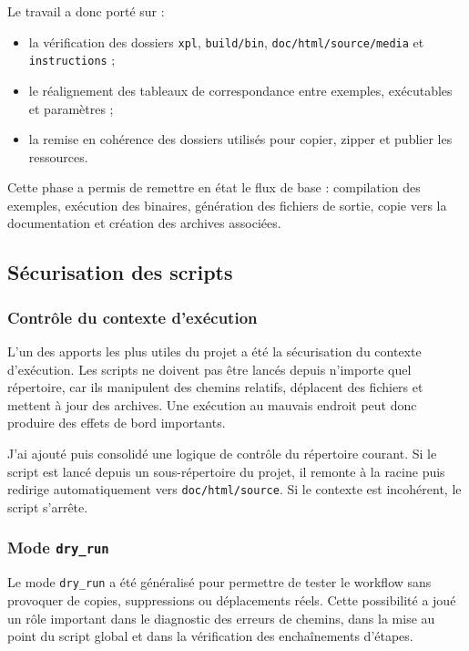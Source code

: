 \documentclass[a4paper,12pt,twoside]{article}
\begin{document}
Le travail a donc porté sur :
\begin{itemize}
    \item la vérification des dossiers \texttt{xpl}, \texttt{build/bin}, \texttt{doc/html/source/media} et \texttt{instructions} ;
    \item le réalignement des tableaux de correspondance entre exemples, exécutables et paramètres ;
    \item la remise en cohérence des dossiers utilisés pour copier, zipper et publier les ressources.
\end{itemize}

Cette phase a permis de remettre en état le flux de base : compilation des exemples, exécution des binaires, génération des fichiers de sortie, copie vers la documentation et création des archives associées.

\subsection{Sécurisation des scripts}

\subsubsection{Contrôle du contexte d'exécution}

L'un des apports les plus utiles du projet a été la sécurisation du contexte d'exécution. Les scripts ne doivent pas être lancés depuis n'importe quel répertoire, car ils manipulent des chemins relatifs, déplacent des fichiers et mettent à jour des archives. Une exécution au mauvais endroit peut donc produire des effets de bord importants.

J'ai ajouté puis consolidé une logique de contrôle du répertoire courant. Si le script est lancé depuis un sous-répertoire du projet, il remonte à la racine puis redirige automatiquement vers \texttt{doc/html/source}. Si le contexte est incohérent, le script s'arrête.

\subsubsection{Mode \texttt{dry\_run}}

Le mode \texttt{dry\_run} a été généralisé pour permettre de tester le workflow sans provoquer de copies, suppressions ou déplacements réels. Cette possibilité a joué un rôle important dans le diagnostic des erreurs de chemins, dans la mise au point du script global et dans la vérification des enchaînements d'étapes.
\end{document}
